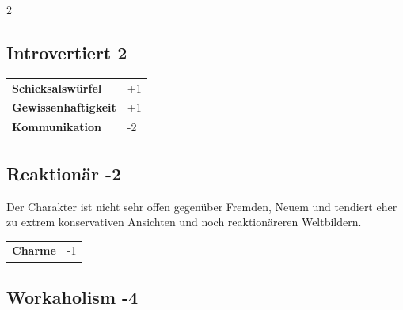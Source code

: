 \begin{multicols}{2}
\begin{tcolorbox}

\end{tcolorbox}

\begin{tcolorbox}
    \subsection*{Introvertiert \hfill \small{2 }}
    \tcblower




\begin{tabular}{@{}ll@{}}
    \textbf{Schicksalswürfel} & +1\\
    \textbf{Gewissenhaftigkeit} & +1\\
    \textbf{Kommunikation} & -2\\
\end{tabular}


\end{tcolorbox}

\begin{tcolorbox}
    \subsection*{Reaktionär \hfill \small{-2 }}
    \tcblower
Der Charakter ist nicht sehr offen gegenüber Fremden, Neuem und tendiert eher zu extrem konservativen Ansichten und noch reaktionäreren Weltbildern.


\vspace{3mm}

\begin{tabular}{@{}ll@{}}
    \textbf{Charme} & -1\\
\end{tabular}


\end{tcolorbox}

\begin{tcolorbox}
    \subsection*{Workaholism \hfill \small{-4 }}
    \tcblower





\end{tcolorbox}
\end{multicols}
